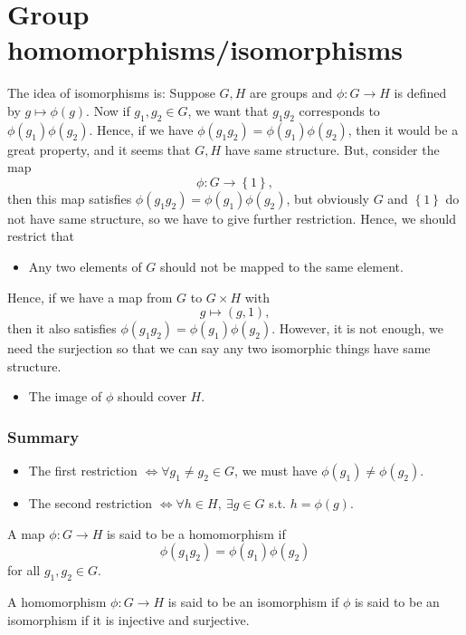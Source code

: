 \section{Group homomorphisms/isomorphisms}
The idea of isomorphisms is: Suppose \(G, H\) are groups and \(\phi :G \to  H\) is defined by \(g \mapsto \phi (g)\). Now if \(g_1, g_2 \in G\), we want that \(g_1 g_2\) corresponds to \(\phi (g_1) \phi (g_2)\). Hence, if we have \(\phi (g_1 g_2)= \phi (g_1) \phi (g_2)\), then it would be a great property, and it seems that \(G,H\) have same structure. But, consider the map 
\[
    \phi : G \to \left\{ 1 \right\}, 
\] then this map satisfies \(\phi (g_1 g_2) = \phi (g_1) \phi (g_2)\), but obviously \(G\) and \(\left\{ 1 \right\} \) do not have same structure, so we have to give further restriction. Hence, we should restrict that 
\begin{itemize}
    \item Any two elements of \(G\) should not be mapped to the same element. 
\end{itemize}   
Hence, if we have a map from \(G\) to \(G \times H\) with  
\[
    g \mapsto (g, 1),
\] then it also satisfies \(\phi (g_1 g_2) = \phi (g_1) \phi (g_2)\). However, it is not enough, we need the surjection so that we can say any two isomorphic things have same structure. 
\begin{itemize}
    \item The image of \(\phi \) should cover \(H\).  
\end{itemize}

\subsubsection{Summary}
\begin{itemize}
    \item The first restriction \(\iff \forall g_1 \neq g_2 \in G\), we must have \(\phi (g_1) \neq \phi (g_2)\). 
    \item The second restriction \(\iff \forall h \in H, \ \exists g \in G\) s.t. \(h = \phi (g)\).    
\end{itemize}
\begin{definition}
    A map \(\phi :G \to H\) is said to be a homomorphism if 
    \[
        \phi (g_1 g_2) = \phi (g_1) \phi (g_2)
    \] for all \(g_1, g_2 \in G\). 
\end{definition}

\begin{definition}
    A homomorphism \(\phi : G \to H\) is said to be an isomorphism if \(\phi \) is said to be an isomorphism if it is injective and surjective.  
\end{definition}

